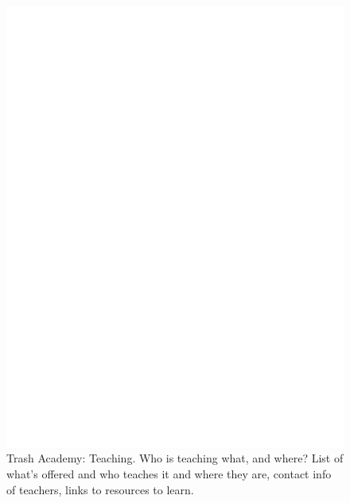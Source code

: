 \documentclass{report}
\begin{document}
\begin{figure}
	\centering
	\includegraphics[width=5in]{imageserver/uploadimages/image3.png}
	\caption{Trash Academy: Teaching. Who is teaching what, and where?  List of what's offered and who teaches it and where they are, contact info of teachers, links to resources to learn.}
\end{figure}
\end{document}

